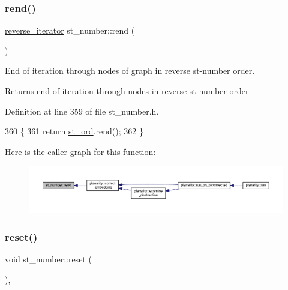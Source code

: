 \subsubsection{\texorpdfstring{rend()}{rend()}}
{\footnotesize\ttfamily \mbox{\hyperlink{classst__number_a7db0e7ac82d781b75e1712c1fe5c055e}{reverse\+\_\+iterator}} st\+\_\+number\+::rend (\begin{DoxyParamCaption}{ }\end{DoxyParamCaption})\hspace{0.3cm}{\ttfamily [inline]}}



End of iteration through nodes of graph in reverse st-\/number order. 

\begin{DoxyReturn}{Returns}
end of iteration through nodes in reverse st-\/number order 
\end{DoxyReturn}


Definition at line 359 of file st\+\_\+number.\+h.


\begin{DoxyCode}
360     \{
361     \textcolor{keywordflow}{return} \mbox{\hyperlink{classst__number_af2160b5e111fe3730b4f9f3f3d09f98f}{st\_ord}}.rend();
362     \}
\end{DoxyCode}
Here is the caller graph for this function\+:\nopagebreak
\begin{figure}[H]
\begin{center}
\leavevmode
\includegraphics[width=350pt]{classst__number_a4c5fdce6ab2be7ee9ddbb09e8d5c8560_icgraph}
\end{center}
\end{figure}
\mbox{\label{classst__number_ae6f86706b8ae3495d3794b8c684fff0f}} 
\subsubsection{\texorpdfstring{reset()}{reset()}}
{\footnotesize\ttfamily void st\+\_\+number\+::reset (\begin{DoxyParamCaption}{ }\end{DoxyParamCaption})\hspace{0.3cm}{\ttfamily [inline]}, {\ttfamily [virtual]}}



